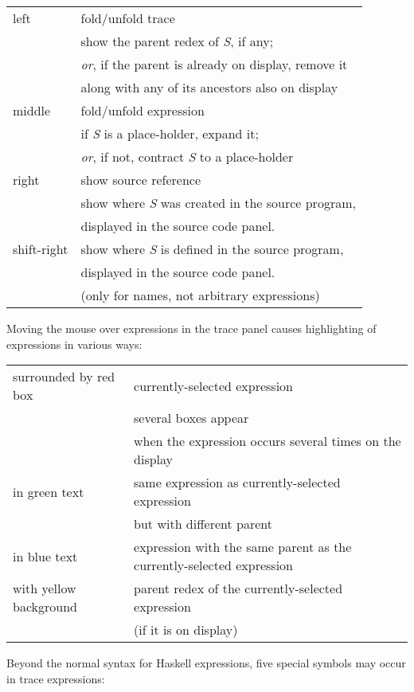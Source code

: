 \documentclass[12pt]{article}
\begin{document}
\begin{center}
\begin{tabular}{ll}
left &
fold/unfold trace\\
&\quad show the parent redex of \emph{S}, if any;\\
&\quad \emph{or}, if the parent is already on
display, remove it\\ 
&\quad along with any of its
ancestors also on display
\\
middle &
fold/unfold expression\\
&\quad if \emph{S} is a place-holder, expand it;\\
&\quad \emph{or}, if not, contract \emph{S} to a
place-holder
\\
right &
show source reference\\
&\quad show where \emph{S} was created in the
source program,\\
&\quad displayed in the source code panel.
\\
shift-right &
\quad show where \emph{S} is defined in the source program,\\ 
&\quad displayed in the source code panel.\\
&\quad (only for names, not arbitrary expressions)
\end{tabular}
\end{center}

\noindent
Moving the mouse over expressions in the trace panel causes highlighting of expressions in various ways:

\begin{center}
\begin{tabular}{ll}
surrounded by red box & currently-selected expression \\
& several boxes appear\\
& when the expression occurs several times on the display \\
in green text & same expression as currently-selected expression \\
& but with different parent \\
in blue text & expression with the same parent as the currently-selected expression \\
with yellow background & parent redex of the currently-selected expression\\
& (if it is on display)
\end{tabular}
\end{center}

\noindent
Beyond the normal syntax for Haskell expressions, five special
symbols may occur in trace expressions:
\end{document}
